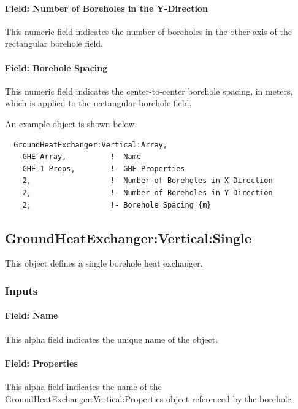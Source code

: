 \paragraph{Field: Number of Boreholes in the Y-Direction}

This numeric field indicates the number of boreholes in the other axis of the rectangular borehole field.

\paragraph{Field: Borehole Spacing}

This numeric field indicates the center-to-center borehole spacing, in meters, which is applied to the rectangular borehole field.

An example object is shown below.

\begin{lstlisting}
  GroundHeatExchanger:Vertical:Array,
    GHE-Array,          !- Name
    GHE-1 Props,        !- GHE Properties
    2,                  !- Number of Boreholes in X Direction
    2,                  !- Number of Boreholes in Y Direction
    2;                  !- Borehole Spacing {m}
\end{lstlisting}

\subsection{GroundHeatExchanger:Vertical:Single}\label{groundheatexchangerverticalsingle}

This object defines a single borehole heat exchanger.

\subsubsection{Inputs}

\paragraph{Field: Name}

This alpha field indicates the unique name of the object.

\paragraph{Field: Properties}

This alpha field indicates the name of the GroundHeatExchanger:Vertical:Properties object referenced by the borehole.

